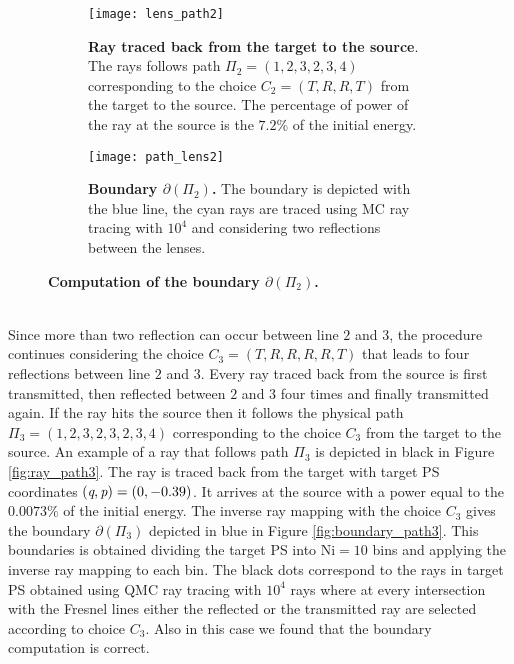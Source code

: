 \begin{figure}[t]
\centering
\begin{subfigure}[t]{.45\textwidth}
  \texttt{[image: lens\_path2]}
 \caption{\textbf{Ray traced back from the target to the source}. The rays follows path $\Pi_2 = (1,2,3,2,3,4)$ corresponding to the choice $C_2=(T,R,R,T)$ from the target to the source. The percentage of power of the ray at the source is the $7.2\%$ of the initial energy.}
  \label{fig:ray_path2}
\end{subfigure}%
\hfill
\begin{subfigure}[t]{.45\textwidth}
  \texttt{[image: path\_lens2]}
  \caption{\textbf{Boundary $\partial$$(\Pi_2)$.} The boundary is depicted with the blue line, the cyan rays are traced using MC ray tracing with $10^4$ and considering two reflections between the lenses.} %
  \label{fig:boundary_path2}
\end{subfigure} %
\caption{\textbf{Computation of the boundary $\partial$$(\Pi_2)$.}}
\end{figure}
\\ \indent Since more than two reflection can occur between line $2$ and $3$, the procedure continues considering the choice $C_3 = (T,R,R,R,R,T)$ that leads to four reflections between line $2$ and $3$. Every ray traced back from the source is first transmitted, then reflected between $2$ and $3$ four times and finally transmitted again. If the ray hits the source then it follows the physical path $\Pi_{3} = (1,2,3,2,3,2,3,4)$ corresponding to the choice $C_3$ from the target to the source. An example of a ray that follows path $\Pi_3$ is depicted in black in Figure \ref{fig:ray_path3}. The ray is traced back from the target with target PS coordinates $(\textit{q}, \textit{p})=(0,-0.39)$. It arrives at the source with a power equal to the $0.0073\%$ of the initial energy. The inverse ray mapping with the choice $C_3$ gives the boundary $\partial$$(\Pi_3)$ depicted in blue in Figure \ref{fig:boundary_path3}. This boundaries is obtained dividing the target PS into $\textrm{Ni}=10$ bins and applying the inverse ray mapping to each bin. The black dots correspond to the rays in target PS obtained using QMC ray tracing with $10^4$ rays where at every intersection with the Fresnel lines either the reflected or the transmitted ray are selected according to choice $C_3$. Also in this case we found that the boundary computation is correct.
